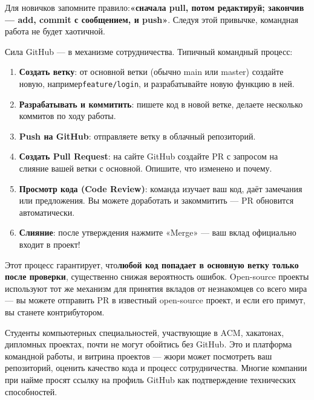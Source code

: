 Для новичков запомните правило:\textbf{«сначала pull, потом редактируй; закончив — add, commit с сообщением, и push»}. Следуя этой привычке, командная работа не будет хаотичной.


Сила GitHub — в механизме сотрудничества. Типичный командный процесс:

\begin{enumerate}
  \item \textbf{Создать ветку}: от основной ветки (обычно main или master) создайте новую, например\texttt{feature/\allowbreak login}, и разрабатывайте новую функцию в ней.
  \item \textbf{Разрабатывать и коммитить}: пишете код в новой ветке, делаете несколько коммитов по ходу работы.
  \item \textbf{Push на GitHub}: отправляете ветку в облачный репозиторий.
  \item \textbf{Создать Pull Request}: на сайте GitHub создайте PR с запросом на слияние вашей ветки с основной. Опишите, что изменено и почему.
  \item \textbf{Просмотр кода (Code Review)}: команда изучает ваш код, даёт замечания или предложения. Вы можете доработать и закоммитить — PR обновится автоматически.
  \item \textbf{Слияние}: после утверждения нажмите «Merge» — ваш вклад официально входит в проект!
\end{enumerate}

Этот процесс гарантирует, что\textbf{любой код попадает в основную ветку только после проверки}, существенно снижая вероятность ошибок. Open-source проекты используют тот же механизм для принятия вкладов от незнакомцев со всего мира — вы можете отправить PR в известный open-source проект, и если его примут, вы станете контрибутором.



Студенты компьютерных специальностей, участвующие в ACM, хакатонах, дипломных проектах, почти не могут обойтись без GitHub. Это и платформа командной работы, и витрина проектов — жюри может посмотреть ваш репозиторий, оценить качество кода и процесс сотрудничества. Многие компании при найме просят ссылку на профиль GitHub как подтверждение технических способностей.


